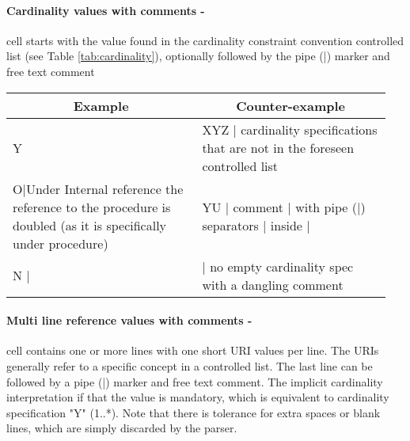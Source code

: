     \paragraph*{Cardinality values with comments -}
    cell starts with the value found in the cardinality constraint convention controlled list (see Table \ref{tab:cardinality}), optionally followed by the pipe (|) marker and free text comment
    \\

    \begin{tabular}{|p{0.475\linewidth}|p{0.475\linewidth}|}
        \hline
        \multicolumn{1}{|c|}{\textbf{Example}}                                                                       & \multicolumn{1}{c|}{\textbf{Counter-example}}                                 \\ \hline
        Y                                                                                                            & XYZ | cardinality specifications that are not in the foreseen controlled list \\ \hline
        O|Under Internal reference the reference to the procedure is doubled (as it is specifically under procedure) & YU | comment | with pipe (|) separators | inside |                            \\ \hline
        N |                                                                                                          & | no empty cardinality spec with a dangling comment                           \\ \hline
    \end{tabular}

    \paragraph*{Multi line reference values with comments -} cell contains one or more lines with one short URI values per line. The URIs generally refer to a specific concept in a controlled list. The last line can be followed by a pipe (|) marker and free text comment. The implicit cardinality interpretation if that the value is mandatory, which is equivalent to cardinality specification "Y" (1..*). Note that there is tolerance for extra spaces or blank lines, which are simply discarded by the parser.
    \\

